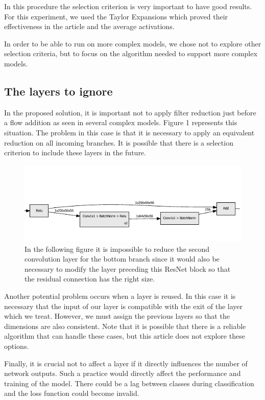\documentclass[12pt]{article}
\begin{document}
In this procedure the selection criterion is very important to have good results. For this experiment, we used the Taylor Expansions which proved their effectiveness in the article and the average activations.

In order to be able to run on more complex models, we chose not to explore other selection criteria, but to focus on the algorithm needed to support more complex models.

\subsection{The layers to ignore }
In the proposed solution, it is important not to apply filter reduction just before a flow addition as seen in several complex models. Figure 1 represents this situation. The problem in this case is that it is necessary to apply an equivalent reduction on all incoming branches. It is possible that there is a selection criterion to include these layers in the future.

\begin{figure}[H]
	\centering
	\includegraphics{fig/residual_add}
	\caption{In the following figure it is impossible to reduce the second convolution layer for the bottom branch since it would also be necessary to modify the layer preceding this ResNet block so that the residual connection has the right size.}
	\label{fig:residualadd}
\end{figure}

Another potential problem occurs when a layer is reused. In this case it is necessary that the input of our layer is compatible with the exit of the layer which we treat. However, we must assign the previous layers so that the dimensions are also consistent.
\newpage
Note that it is possible that there is a reliable algorithm that can handle these cases, but this article does not explore these options.

Finally, it is crucial not to affect a layer if it directly influences the number of network outputs. Such a practice would directly affect the performance and training of the model. There could be a lag between classes during classification and the loss function could become invalid.
\end{document}
